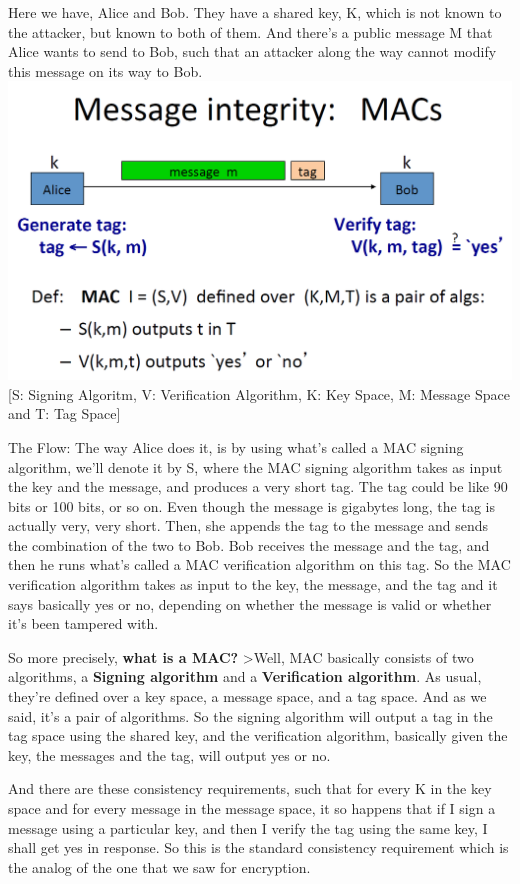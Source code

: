 \documentclass[11pt]{article}
\makeatletter
\def\maxwidth{\ifdim\Gin@nat@width>\linewidth\linewidth
    \else\Gin@nat@width\fi}
\let\Oldincludegraphics\includegraphics
\renewcommand{\includegraphics}[1]{\Oldincludegraphics[width=.8\maxwidth]{#1}}
\makeatother
\begin{document}
Here we have, Alice and Bob. They have a shared key, K, which is not
known to the attacker, but known to both of them. And there's a public
message M that Alice wants to send to Bob, such that an attacker along
the way cannot modify this message on its way to Bob.
\includegraphics{./Images/MAC.png} {[}S: Signing Algoritm, V:
Verification Algorithm, K: Key Space, M: Message Space and T: Tag
Space{]}

The Flow: The way Alice does it, is by using what's called a MAC signing
algorithm, we'll denote it by S, where the MAC signing algorithm takes
as input the key and the message, and produces a very short tag. The tag
could be like 90 bits or 100 bits, or so on. Even though the message is
gigabytes long, the tag is actually very, very short. Then, she appends
the tag to the message and sends the combination of the two to Bob. Bob
receives the message and the tag, and then he runs what's called a MAC
verification algorithm on this tag. So the MAC verification algorithm
takes as input to the key, the message, and the tag and it says
basically yes or no, depending on whether the message is valid or
whether it's been tampered with.

So more precisely, \textbf{what is a MAC? } \textgreater{}Well, MAC
basically consists of two algorithms, a \textbf{Signing algorithm} and a
\textbf{Verification algorithm}. As usual, they're defined over a key
space, a message space, and a tag space. And as we said, it's a pair of
algorithms. So the signing algorithm will output a tag in the tag space
using the shared key, and the verification algorithm, basically given
the key, the messages and the tag, will output yes or no.

And there are these consistency requirements, such that for every K in
the key space and for every message in the message space, it so happens
that if I sign a message using a particular key, and then I verify the
tag using the same key, I shall get yes in response. So this is the
standard consistency requirement which is the analog of the one that we
saw for encryption.
\end{document}
